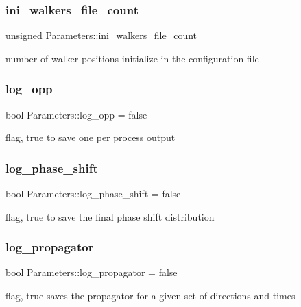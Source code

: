 \subsubsection{\texorpdfstring{ini\+\_\+walkers\+\_\+file\+\_\+count}{ini\_walkers\_file\_count}}
{\footnotesize\ttfamily unsigned Parameters\+::ini\+\_\+walkers\+\_\+file\+\_\+count}

number of walker positions initialize in the configuration file \mbox{\label{class_parameters_ae30abbd794dee7f5aaf5d3d51152acef}} 
\subsubsection{\texorpdfstring{log\+\_\+opp}{log\_opp}}
{\footnotesize\ttfamily bool Parameters\+::log\+\_\+opp = false}

flag, true to save one per process output \mbox{\label{class_parameters_a947e4b1fef66466119ea7b2e8e2bc0e4}} 
\subsubsection{\texorpdfstring{log\+\_\+phase\+\_\+shift}{log\_phase\_shift}}
{\footnotesize\ttfamily bool Parameters\+::log\+\_\+phase\+\_\+shift = false}

flag, true to save the final phase shift distribution \mbox{\label{class_parameters_a1f5a62a35d6521994a623d0fd0a98a24}} 
\subsubsection{\texorpdfstring{log\+\_\+propagator}{log\_propagator}}
{\footnotesize\ttfamily bool Parameters\+::log\+\_\+propagator = false}

flag, true saves the propagator for a given set of directions and times \mbox{\label{class_parameters_a879b4c717e0f59c9bbc4b7810b8fdde3}} 
